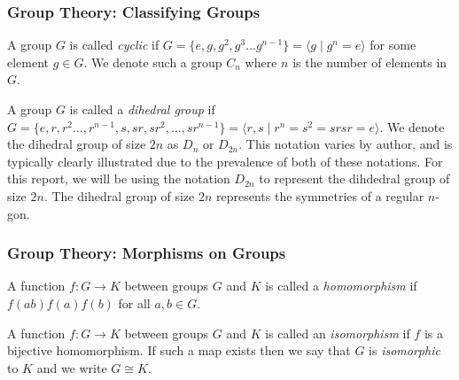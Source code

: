\documentclass{beamer}
\newcommand{\iso}{\cong}
\begin{document}
\begin{frame}
\frametitle{Group Theory: Classifying Groups}
        \begin{definition}\label{def:cyclic}
                A group $G$ is called \textit{cyclic} if $G = \{e, g, g^2, g^3 \dots g^{n-1}\} = \langle g \mid g^n = e \rangle$ for some element $g \in G$. 
                We denote such a group $C_n$ where $n$ is the number of elements in $G$.
        \end{definition}

        \begin{definition}\label{def:dihedral}
                A group $G$ is called a \textit{dihedral group} if $G = \{e, r, r^2 \dots, r^{n-1}, s, sr, sr^2, \dots, sr^{n-1}\} = \langle r, s \mid r^n = s^2 = srsr = e \rangle$. 
                We denote the dihedral group of size $2n$ as $D_n$ or $D_{2n}$.
                This notation varies by author, and is typically clearly illustrated due to the prevalence of both of these notations.
                For this report, we will be using the notation $D_{2n}$ to represent the dihdedral group of size $2n$.
                The dihedral group of size $2n$ represents the symmetries of a regular $n$-gon.
        \end{definition}
\end{frame}

\begin{frame}
\frametitle{Group Theory: Morphisms on Groups}
        \begin{definition}[Homomorphism]\label{def:homomorphism}
                A function $f: G \to K$ between groups $G$ and $K$ is called a \textit{homomorphism} if $f(ab) f(a)f(b)$ for all $a, b \in G$.
        \end{definition}

        \begin{definition}[Isomorphism]\label{def:isomorphism}
                A function $f: G \to K$ between groups $G$ and $K$ is called an \textit{isomorphism} if $f$ is a bijective homomorphism.
                If such a map exists then we say that $G$ is \textit{isomorphic} to $K$ and we write $G \iso K$.
        \end{definition}
\end{frame}
\end{document}
